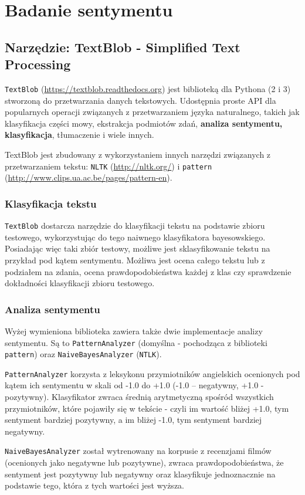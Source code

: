 \section{Badanie sentymentu}
\label{sec:sentyment}
\subsection{Narzędzie: TextBlob - Simplified Text Processing}
\texttt{TextBlob} (\url{https://textblob.readthedocs.org}) jest biblioteką dla
Pythona (2 i 3) stworzoną do przetwarzania danych tekstowych.
Udostępnia proste API dla popularnych operacji związanych z przetwarzaniem
języka naturalnego, takich jak klasyfikacja części mowy, ekstrakcja podmiotów
zdań, \textbf{analiza sentymentu, klasyfikacja}, tłumaczenie i wiele innych.

TextBlob jest zbudowany z wykorzystaniem innych narzędzi związanych z
przetwarzaniem tekstu: \texttt{NLTK} (\url{http://nltk.org/}) i \texttt{pattern}
(\url{http://www.clips.ua.ac.be/pages/pattern-en}).

\subsubsection{Klasyfikacja tekstu}
\texttt{TextBlob} dostarcza narzędzie do klasyfikacji tekstu na podstawie zbioru
testowego, wykorzystując do tego naiwnego klasyfikatora bayesowskiego.
Posiadając więc taki zbiór testowy, możliwe jest sklasyfikowanie tekstu na
przykład pod kątem sentymentu. Możliwa jest ocena całego tekstu lub z podziałem
na zdania, ocena prawdopodobieństwa każdej z klas czy sprawdzenie dokładności
klasyfikacji zbioru testowego.

\subsubsection{Analiza sentymentu}
Wyżej wymieniona biblioteka zawiera także dwie implementacje analizy sentymentu.
Są to \texttt{PatternAnalyzer} (domyślna - pochodząca z biblioteki
\texttt{pattern}) oraz \texttt{NaiveBayesAnalyzer} (\texttt{NTLK}).

\texttt{PatternAnalyzer} korzysta z leksykonu przymiotników angielskich
ocenionych pod kątem ich sentymentu w skali od -1.0 do +1.0 (-1.0 -- negatywny,
+1.0 - pozytywny).
Klasyfikator zwraca średnią arytmetyczną spośród wszystkich przymiotników, które
pojawiły się w tekście - czyli im wartość bliżej +1.0, tym sentyment bardziej
pozytywny, a im bliżej -1.0, tym sentyment bardziej negatywny.

\texttt{NaiveBayesAnalyzer} został wytrenowany na korpusie z recenzjami filmów
(ocenionych jako negatywne lub pozytywne), zwraca prawdopodobieństwa, że
sentyment jest pozytywny lub negatywny oraz klasyfikuje jednoznacznie na
podstawie tego, która z tych wartości jest wyższa.
